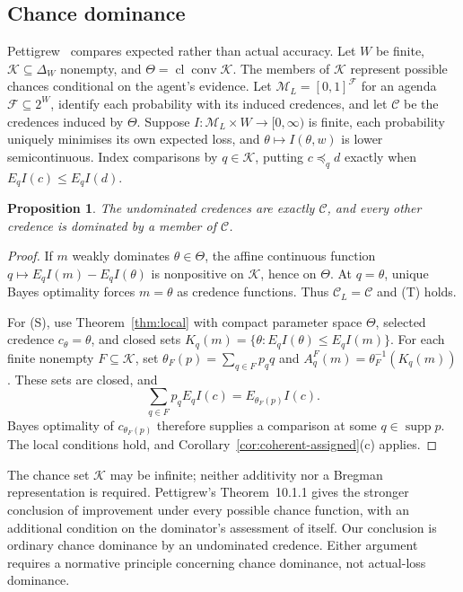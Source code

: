 \documentclass[11pt]{article}
\newtheorem{proposition}[theorem]{Proposition}
\theoremstyle{definition}
\newcommand{\M}{\mathcal M}
\newcommand{\C}{\mathcal C}
\newcommand{\supp}{\operatorname{supp}}
\begin{document}
\subsection{Chance dominance}\label{sec:chance}
Pettigrew~\cite[Chapter~10]{Pettigrew2016} compares expected rather than actual accuracy. Let $W$ be finite, $\mathcal K\subseteq\Delta_W$ nonempty, and $\Theta=\operatorname{cl}\operatorname{conv}\mathcal K$. The members of $\mathcal K$ represent possible chances conditional on the agent's evidence. Let $\M_L=[0,1]^{\mathcal F}$ for an agenda $\mathcal F\subseteq2^W$, identify each probability with its induced credences, and let $\C$ be the credences induced by $\Theta$. Suppose $I:\M_L\times W\to[0,\infty)$ is finite, each probability uniquely minimises its own expected loss, and $\theta\mapsto I(\theta,w)$ is lower semicontinuous. Index comparisons by $q\in\mathcal K$, putting $c\preceq_q d$ exactly when $E_qI(c)\le E_qI(d)$.
\begin{proposition}\label{prop:short-chance}
The undominated credences are exactly $\C$, and every other credence is dominated by a member of $\C$.
\end{proposition}
\begin{proof}
If $m$ weakly dominates $\theta\in\Theta$, the affine continuous function $q\mapsto E_qI(m)-E_qI(\theta)$ is nonpositive on $\mathcal K$, hence on $\Theta$. At $q=\theta$, unique Bayes optimality forces $m=\theta$ as credence functions. Thus $\C_L=\C$ and (T) holds.

For (S), use Theorem~\ref{thm:local} with compact parameter space $\Theta$, selected credence $c_\theta=\theta$, and closed sets $K_q(m)=\{\theta:E_qI(\theta)\le E_qI(m)\}$. For each finite nonempty $F\subseteq\mathcal K$, set $\theta_F(p)=\sum_{q\in F}p_qq$ and $A^F_q(m)=\theta_F^{-1}(K_q(m))$. These sets are closed, and
\[
\sum_{q\in F}p_qE_qI(c)=E_{\theta_F(p)}I(c).
\]
Bayes optimality of $c_{\theta_F(p)}$ therefore supplies a comparison at some $q\in\supp p$. The local conditions hold, and Corollary~\ref{cor:coherent-assigned}(c) applies.
\end{proof}
The chance set $\mathcal K$ may be infinite; neither additivity nor a Bregman representation is required. Pettigrew's Theorem~10.1.1 gives the stronger conclusion of improvement under every possible chance function, with an additional condition on the dominator's assessment of itself. Our conclusion is ordinary chance dominance by an undominated credence. Either argument requires a normative principle concerning chance dominance, not actual-loss dominance.



\end{document}
